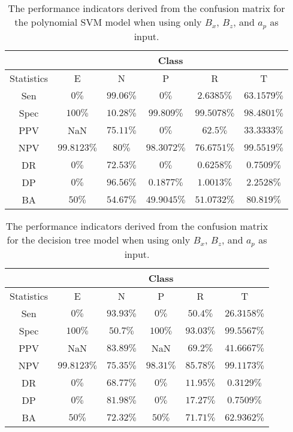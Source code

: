 \begin{table}[!ht]
	\centering
	\begin{tabular}{|c|c|c|c|c|c|}
		\hline
		 & \multicolumn{5}{c|}{Class} \\ \hline
		Statistics & E & N & P & R & T \\ \hline
		Sen & $0\%$ & $99.06\%$ & $0\%$ & $2.6385\%$ & $63.1579\%$ \\ \hline
		Spec & $100\%$ & $10.28\%$ & $99.809\%$ & $99.5078\%$ & $98.4801\%$ \\ \hline
		PPV & NaN & $75.11\%$ & $0\%$ & $62.5\%$ & $33.3333\%$ \\ \hline
		NPV & $99.8123\%$ & $80\%$ & $98.3072\%$ & $76.6751\%$ & $99.5519\%$ \\ \hline
		DR & $0\%$ & $72.53\%$ & $0\%$ & $0.6258\%$ & $0.7509\%$ \\ \hline
		DP & $0\%$ & $96.56\%$ & $0.1877\%$ & $1.0013\%$ & $2.2528\%$ \\ \hline
		BA & $50\%$ & $54.67\%$ & $49.9045\%$ & $51.0732\%$ & $80.819\%$ \\ \hline
	\end{tabular}
	\caption{The performance indicators derived from the confusion matrix for the polynomial SVM model when using only $B_{x}$, $B_{z}$, and $a_{p}$ as input.}
	\label{tab:cs:reverse:xzap:svmPoly}
\end{table}

\begin{table}[!ht]
	\centering
	\begin{tabular}{|c|c|c|c|c|c|}
		\hline
		 & \multicolumn{5}{c|}{Class} \\ \hline
		Statistics & E & N & P & R & T \\ \hline
		Sen & $0\%$ & $93.93\%$ & $0\%$ & $50.4\%$ & $26.3158\%$ \\ \hline
		Spec & $100\%$ & $50.7\%$ & $100\%$ & $93.03\%$ & $99.5567\%$ \\ \hline
		PPV & NaN & $83.89\%$ & NaN & $69.2\%$ & $41.6667\%$ \\ \hline
		NPV & $99.8123\%$ & $75.35\%$ & $98.31\%$ & $85.78\%$ & $99.1173\%$ \\ \hline
		DR & $0\%$ & $68.77\%$ & $0\%$ & $11.95\%$ & $0.3129\%$ \\ \hline
		DP & $0\%$ & $81.98\%$ & $0\%$ & $17.27\%$ & $0.7509\%$ \\ \hline
		BA & $50\%$ & $72.32\%$ & $50\%$ & $71.71\%$ & $62.9362\%$ \\ \hline
	\end{tabular}
	\caption{The performance indicators derived from the confusion matrix for the decision tree model when using only $B_{x}$, $B_{z}$, and $a_{p}$ as input.}
	\label{tab:cs:reverse:xzap:C5.0}
\end{table}

